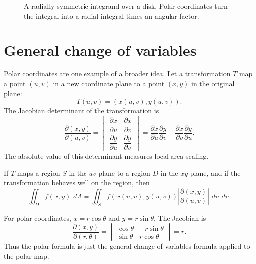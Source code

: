 \documentclass[11pt]{article}
\newcommand{\dd}{\,d}
\newcommand{\Jac}{\frac{\partial(x,y)}{\partial(u,v)}}
\begin{document}
\begin{figure}[H]
\centering
{}
\caption{A radially symmetric integrand over a disk. Polar coordinates turn the integral into a radial integral times an angular factor.}
\end{figure}

\section{General change of variables}

Polar coordinates are one example of a broader idea. Let a transformation $T$ map a point $(u,v)$ in a new coordinate plane to a point $(x,y)$ in the original plane:
\[
T(u,v)=(x(u,v),y(u,v)).
\]
The Jacobian determinant of the transformation is
\[
\Jac=
\begin{vmatrix}
\dfrac{\partial x}{\partial u} & \dfrac{\partial x}{\partial v} \\
\dfrac{\partial y}{\partial u} & \dfrac{\partial y}{\partial v}
\end{vmatrix}
=\frac{\partial x}{\partial u}\frac{\partial y}{\partial v}-\frac{\partial x}{\partial v}\frac{\partial y}{\partial u}.
\]
The absolute value of this determinant measures local area scaling.

\begin{formulabox}
If $T$ maps a region $S$ in the $uv$-plane to a region $D$ in the $xy$-plane, and if the transformation behaves well on the region, then
\[
\iint_D f(x,y)\,\dd A
=\iint_S f(x(u,v),y(u,v))\left|\frac{\partial(x,y)}{\partial(u,v)}\right|\,\dd u\,\dd v.
\]
\end{formulabox}

For polar coordinates, $x=r\cos\theta$ and $y=r\sin\theta$. The Jacobian is
\[
\frac{\partial(x,y)}{\partial(r,\theta)}=
\begin{vmatrix}
\cos\theta & -r\sin\theta\\
\sin\theta & r\cos\theta
\end{vmatrix}=r.
\]
Thus the polar formula is just the general change-of-variables formula applied to the polar map.
\end{document}
